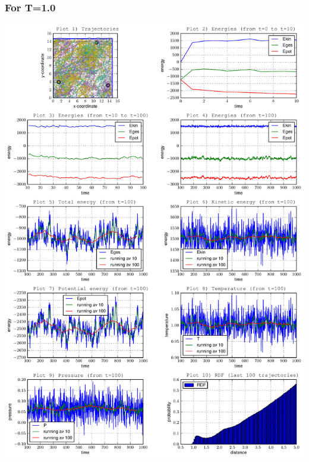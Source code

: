 \documentclass[12pt,a4paper]{scrartcl}
\begin{document}
\subsubsection*{For T=1.0}
\includegraphics[page=1, scale=0.63]{../plots/all10}
\end{document}
